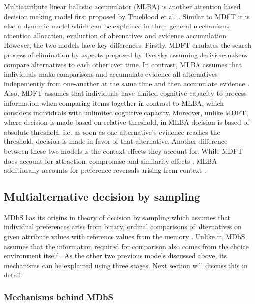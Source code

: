 \documentclass[a4paper,12pt]{article}
\newcommand{\citeyearonly}[1]{\citeyearpar{#1}}
\begin{document}
Multiattribute linear ballistic accumulator (MLBA) is another attention based decision making model first proposed by Trueblood et al. \citeyearonly{trueblood2014multiattribute}. Similar to MDFT it is also a dynamic model which can be explained in three general mechanisms: attention allocation, evaluation of alternatives and evidence accumulation. However, the two models have key differences. Firstly, MDFT emulates the search process of elimination by aspects proposed by Tversky \citeyearonly{tversky1972elimination} assuming decision-makers compare alternatives to each other over time. In contrast, MLBA assumes that individuals make comparisons and accumulate evidence all alternatives indepentently from one-another at the same time and then accumulate evidence \citep{trueblood15fragile}. Also, MDFT assumes that individuals have limited cognitive capacity to process information when comparing items together in contrast to MLBA, which considers individuals with unlimited cognitive capacity. Moreover, unlike MDFT, where decision is made based on relative threshold, in MLBA decision is based of absolute threshold, i.e. as soon as one alternative's evidence reaches the threshold, decision is made in favor of that alternative. Another difference between these two models is the context effects they account for. While MDFT does account for attraction, compromise and similarity effects \citep{hotaling2019quantitative}, MLBA additionally accounts for preference reversals arising from context \citep{trueblood15fragile}. 


\subsection{Multialternative decision by sampling}

MDbS has its origins in theory of decision by sampling which assumes that individual preferences arise from binary, ordinal comparisons of alternatives on given attribute values with reference values from the memory \citep{stewart2006decision}. Unlike it, MDbS assumes that the information required for comparison also comes from the choice environment itself \citep{noguchi2018multialternative}. As the other two previous models discussed above, its mechanisms can be explained using three stages. Next section will discuss this in detail.

\subsubsection{Mechanisms behind MDbS} \label{subsec:mechanismMDBS}
\end{document}
